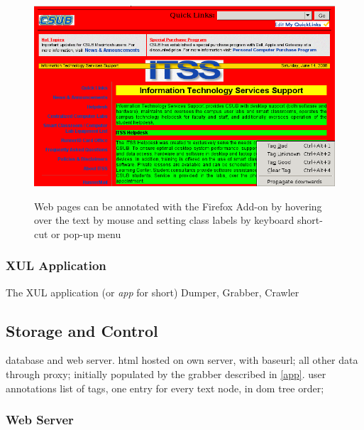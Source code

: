 \begin{figure}
	{\includegraphics[width=\textwidth]{tut0}}
\caption{\label{f:tut0}Web pages can be annotated with the \KrdWrd Firefox Add-on by hovering over the text by mouse and setting class labels by keyboard short-cut or pop-up menu}
\end{figure}


\subsubsection{XUL Application \label{app}}

The XUL application (or \textit{app} for short) 
Dumper, Grabber, Crawler


\subsection{Storage and Control}

database and web server. 
html hosted on own server, with baseurl; all other data through proxy; initially populated by the grabber described in \ref{app}.
user annotations list of tags, one entry for every text node, in dom tree order;


\subsubsection{Web Server}


